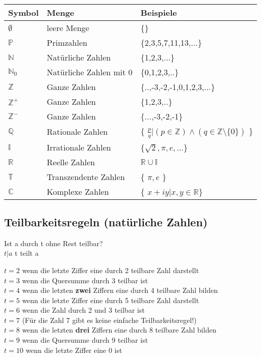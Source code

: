 \begin{tabular}[h]{lll}
Symbol &Menge & Beispiele \\
\hline
$\emptyset$ & leere Menge & \{\} \\
$\mathbb{P}$ & Primzahlen & \{2,3,5,7,11,13,...\} \\
$\mathbb{N}$ & Natürliche Zahlen & \{1,2,3,...\} \\
$\mathbb{N}_0$ & Natürliche Zahlen mit 0 & \{0,1,2,3,..\} \\
$\mathbb{Z}$ & Ganze Zahlen & \{..,-3,-2,-1,0,1,2,3,...\} \\
$\mathbb{Z}^+$ & Ganze Zahlen & \{1,2,3,..\} \\
$\mathbb{Z}^-$ & Ganze Zahlen & \{...,-3,-2,-1\} \\
$\mathbb{Q}$ & Rationale Zahlen & \{ $\frac{p}{q} | (p \in \mathbb{Z}) \wedge (q \in  \mathbb{Z} \setminus \{0 \} ) $ \} \\
$\mathbb{I}$ & Irrationale Zahlen & \{$\sqrt{2},\pi, e,...$\} \\
$\mathbb{R}$ & Reelle Zahlen & $\mathbb{R} \cup \mathbb{I}$\\
$\mathbb{T}$ & Transzendente Zahlen & \{ $\pi, e$ \} \\
$\mathbb{C}$ & Komplexe Zahlen & \{ $x + iy | x,y \in \mathbb{R} $\} \\
\end{tabular}

\subsection{Teilbarkeitsregeln (natürliche Zahlen)}
Ist a durch t ohne Rest teilbar?\\
$t|a$ t teilt a


$t=2$ wenn die letzte Ziffer eine durch 2 teilbare Zahl darstellt\\
$t=3$ wenn die Quersumme durch 3 teilbar ist\\
$t=4$ wenn die letzten \textbf{zwei} Ziffern eine durch 4 teilbare Zahl bilden\\
$t=5$ wenn die letzte Ziffer eine durch 5 teilbare Zahl darstellt\\
$t=6$ wenn die Zahl durch 2 und 3 teilbar ist\\
$t=7$ (Für die Zahl 7 gibt es keine einfache Teilbarkeitsregel!)\\
$t=8$ wenn die letzten \textbf{drei} Ziffern eine durch 8 teilbare Zahl bilden\\
$t=9$ wenn die Quersumme durch 9 teilbar ist\\
$t=10$ wenn die letzte Ziffer eine 0 ist


